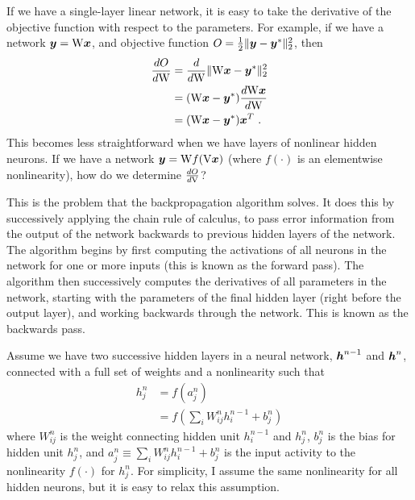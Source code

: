 If we have a single-layer linear network,
it is easy to take the derivative of the objective function
with respect to the parameters.
For example, if we have a network $\boldsymbol{y} = \mathrm{W} \boldsymbol{x}$,
and objective function $O = \frac{1}{2}\|\boldsymbol{y} - \boldsymbol{y}^*\|_2^2$,
then
\begin{align}
  \frac{dO}{d\mathrm{W}} &= \frac{d}{d\mathrm{W}} \|\mathrm{W} \boldsymbol{x} - \boldsymbol{y}^*\|_2^2 \nonumber\\
                   &= (\mathrm{W} \boldsymbol{x} - \boldsymbol{y}^*) \frac{d\mathrm{W} \boldsymbol{x}}{d\mathrm{W}} \nonumber\\
                   &= (\mathrm{W} \boldsymbol{x} - \boldsymbol{y}^*) \boldsymbol{x}^T \text{ .}
\end{align}
This becomes less straightforward
when we have layers of nonlinear hidden neurons.
If we have a network $\boldsymbol{y} = \mathrm{W} f(\mathrm{V} \boldsymbol{x})$
(where $f(\cdot)$ is an elementwise nonlinearity),
how do we determine $\frac{dO}{d\mathrm{V}}$?

This is the problem that the backpropagation algorithm solves.
It does this by successively applying the chain rule of calculus,
to pass error information from the output of the network
backwards to previous hidden layers of the network.
The algorithm begins by first computing the activations
of all neurons in the network for one or more inputs
(this is known as the forward pass).
The algorithm then successively computes the derivatives
of all parameters in the network,
starting with the parameters of the final hidden layer
(right before the output layer),
and working backwards through the network.
This is known as the backwards pass.

Assume we have two successive hidden layers in a neural network,
$\boldsymbol{h}^{n-1}$ and $\boldsymbol{h}^n$,
connected with a full set of weights and a nonlinearity such that
\begin{align}
  h_j^n &= f\left(a_j^n\right) \nonumber\\
        &= f\left(\sum_i W_{ij}^n h_i^{n-1} + b_j^n\right)
\end{align}
where $W_{ij}^n$ is the weight connecting hidden unit $h_i^{n-1}$ and $h_j^n$,
$b_j^n$ is the bias for hidden unit $h_j^n$,
and $a_j^n \equiv \sum_i W_{ij}^n h_i^{n-1} + b_j^n$ is the input activity
to the nonlinearity $f(\cdot)$ for $h_j^n$.
For simplicity, I assume the same nonlinearity for all hidden neurons,
but it is easy to relax this assumption.

